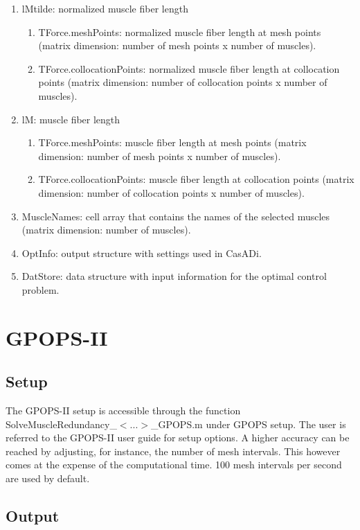 \documentclass[a4paper,oneside,11pt]{article}
\begin{document}
\begin{enumerate}
\begin{enumerate}
	\end{enumerate}	
	\item lMtilde: normalized muscle fiber length 
	\begin{enumerate}
	\item TForce.meshPoints: normalized muscle fiber length at mesh points (matrix dimension: number of mesh points x number of muscles).
	\item TForce.collocationPoints: normalized muscle fiber length at collocation points (matrix dimension: number of collocation points x number of muscles). 
	\end{enumerate}	
	\item lM: muscle fiber length
	\begin{enumerate}
	\item TForce.meshPoints: muscle fiber length at mesh points (matrix dimension: number of mesh points x number of muscles).
	\item TForce.collocationPoints: muscle fiber length at collocation points (matrix dimension: number of collocation points x number of muscles). 
	\end{enumerate}	
	\item MuscleNames: cell array that contains the names of the selected muscles (matrix dimension: number of muscles).
	\item OptInfo: output structure with settings used in CasADi.
	\item DatStore: data structure with input information for the optimal control problem.
\end{enumerate}


\section{GPOPS-II}
\subsection{Setup}

The GPOPS-II setup is accessible through the function SolveMuscleRedundancy_$<...>$_GPOPS.m under GPOPS setup. The user is referred to the GPOPS-II user guide for setup options. A higher accuracy can be reached by adjusting, for instance, the number of mesh intervals. This however comes at the expense of the computational time. 100 mesh intervals per second are used by default.

\subsection{Output}
\end{document}
